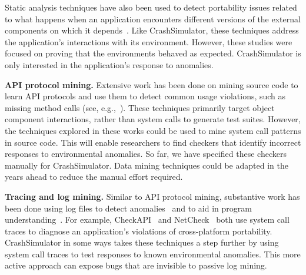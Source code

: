 Static analysis techniques have also been
used to detect portability issues related to what happens when an
application encounters different
versions of the external components on which
it depends~\cite{silakov2010improving, javacompliance-www}. Like
CrashSimulator, these techniques
address the application's interactions with its
environment. However, these studies were focused on proving that the
environments behaved as expected.
CrashSimulator is only interested in the application's
response to anomalies.

\iffalse
\noindent
{\bf Specification and run-time verification.}
Substantial work has been done in validating API and protocol behaviors,
e.g., finding faults in the Linux TCP implementation, SSH2 and
RCP~\cite{Udrea:2008}, BGP configuration~\cite{Feamster:2005}, and
identifying network vulnerabilities~\cite{ritchey-sp00}.
\fi

\noindent
{\bf API protocol mining.}
Extensive work has been done on mining source code to learn API protocols
and use them to detect common usage violations, such as missing method calls
(see, e.g.,~\cite{mariani2007compatibility,
DBLP:journals/ase/WasylkowskiZ11, DBLP:conf/icse/PradelJAG12,
DBLP:journals/tosem/MonperrusM13, DBLP:conf/icse/JamrozikSZ16}). These
techniques primarily target object component interactions, rather than
system calls to generate test suites. However, the techniques explored in
these works could be used to mine system call patterns in source code.
This will enable researchers
to find checkers that identify incorrect responses to environmental
anomalies. So far, we have specified these checkers manually for
CrashSimulator.  Data mining techniques could be adapted in the years
ahead to reduce the manual effort required.

\noindent
{\bf Tracing and log mining.}
Similar to API protocol mining, substantive work has been done using
log files to detect anomalies~\cite{pinpoint,
jiang_abnormal_trace_detection_icac_2005, xu2009detecting, lou2010mining2}
and to aid in program understanding~\cite{yuan2010sherlog,
beschastnikh_synoptic_fse_2011, csight_icse_2014}.
For example, CheckAPI~\cite{rasley2015detecting}
and NetCheck~\cite{Zhuang_NSDI_2014} both
use system call traces to diagnose an application's violations of
cross-platform portability.  CrashSimulator in some ways takes these
techniques a step further by using
system call traces
to test responses to known environmental anomalies.
This more active approach can expose bugs that
are invisible to passive log mining.


